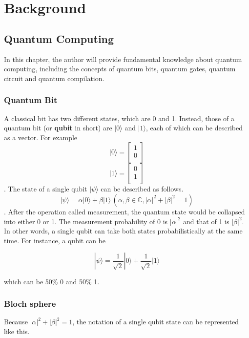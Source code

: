 \chapter{Background}
\label{theory_of_quantum_information}
\section{ Quantum Computing}

 In this chapter, the author will provide fundamental knowledge about quantum computing, including the concepts of quantum bits, quantum gates, quantum circuit and quantum compilation.

\subsection{Quantum Bit}

 A classical bit has two different states, which are 0 and 1.   Instead, those of a quantum bit (or \textbf{qubit} in short) are $|0\rangle$ and $|1\rangle$, each of which can be described as a vector. For example  
 $$|0\rangle = \left[
\begin{array}{c}
1 \\
0 \\
\end{array}
\right]$$
 $$|1\rangle = \left[
\begin{array}{c}
0 \\
1 \\
\end{array}
\right]$$
.
The state of a single 	qubit $|\psi\rangle$ can be described as follows.
$$ |\psi\rangle = \alpha |0\rangle + \beta |1\rangle \,(\alpha, \beta \in \mathbb{C}, |\alpha|^2+|\beta|^2=1)$$.
 After the operation called measurement, the quantum state would be collapsed into either 0 or 1.  The measurement probability of 0 is $|\alpha|^2$ and that of 1 is $|\beta|^2$. In other words, a single qubit can take both states probabilistically at the same time.  For instance, a qubit can be 
 
\begin{equation}
	|\psi\rangle = \frac{1}{\sqrt{2}}|0\rangle + \frac{1}{\sqrt{2}}|1\rangle \tag{1}
\end{equation}

 which can be 50\% 0 and 50\% 1.
 
 \subsection{Bloch sphere}
 	Because $|\alpha|^2 + |\beta|^2 = 1$, the notation of a single qubit state can be represented like this.
	
